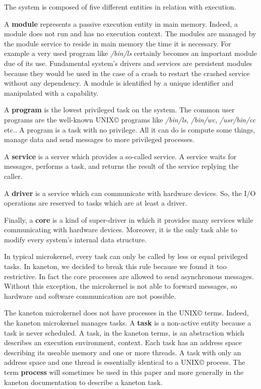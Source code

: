 \begin{multicols}{2}
The system is composed of five different entities in relation with execution.

A \textbf{module} represents a passive execution entity in main memory.
Indeed, a module does not run and has no execution context. The modules are
managed by the module service to reside in main memory the time it is
necessary. For example a very used program like \textit{/bin/ls} certainly
becomes an important module due of its use. Fundamental system's drivers
and services are persistent modules because they would be used in the case
of a crash to restart the crashed service without any dependency.
A module is identified by a unique identifier and manipulated with a
capability.

A \textbf{program} is the lowest privileged task on the system.
The common user programs are the well-known UNIX{\scriptsize \copyright}
programs like \textit{/bin/ls}, \textit{/bin/wc}, \textit{/usr/bin/cc} etc..
A program is a task with no privilege. All it can do is compute some things,
manage data and send messages to more privileged processes.

A \textbf{service} is a server which provides a so-called service. A service
waits for messages, performs a task, and returns the result of the service
replying the caller.

A \textbf{driver} is a service which can communicate with hardware devices.
So, the I/O operations are reserved to tasks which are at least a driver.

Finally, a \textbf{core} is a kind of super-driver in which it provides
many services while communicating with hardware devices. Moreover, it is
the only task able to modify every system's internal data structure.

In typical microkernel, every task can only be called by less or equal
privileged tasks. In kaneton, we decided to break this rule because we found
it too restrictive. In fact the core processes are allowed to send
asynchronous messages. Without this exception, the microkernel is not able
to forward messages, so hardware and software communication are not
possible.

The kaneton microkernel does not have processes in the
UNIX{\scriptsize \copyright} terms. Indeed, the kaneton microkernel manages
tasks. A \textbf{task} is a non-active entity because a task is never
scheduled. A task, in the kaneton terms, is an abstraction which describes
an execution environment, context. Each task has an address space describing
its useable memory and one or more threads. A task with only an address
space and one thread is essentially identical to a UNIX{\scriptsize \copyright}
process. The term \textbf{process} will sometimes be used in this paper and
more generally in the kaneton documentation to describe a kaneton task.


\end{multicols}
